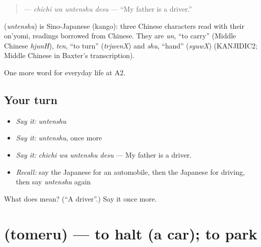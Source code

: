 \begin{quote}
\textbf{ } — \emph{chichi wa untenshu desu} — \textquotedblleft{}My father is a driver.\textquotedblright{}
\end{quote}

\begin{cousinweb}
\textbf{} (\emph{untenshu}) is Sino-Japanese (kango): three Chinese characters read with their on'yomi, readings borrowed from Chinese. They are \emph{un}, \textquotedblleft{}to carry\textquotedblright{} (Middle Chinese \emph{hjunH}), \emph{ten}, \textquotedblleft{}to turn\textquotedblright{} (\emph{trjwenX}) and \emph{shu}, \textquotedblleft{}hand\textquotedblright{} (\emph{syuwX}) (KANJIDIC2; Middle Chinese in Baxter's transcription).
\end{cousinweb}

\begin{grammarlens}[title={What you've built}]
One more word for everyday life at A2.
\end{grammarlens}

\subsection*{Your turn}
\begin{itemize}
\raggedright
  \item \emph{Say it:} \emph{untenshu}
  \item \emph{Say it:} \emph{untenshu}, once more
  \item \emph{Say it:} \emph{chichi wa untenshu desu} — My father is a driver.
  \item \emph{Recall:} say the Japanese for an automobile, then the Japanese for driving, then say \emph{untenshu} again
\end{itemize}

\begin{tcolorbox}[breakable,colback=teal!4,colframe=teal!35!black,title={Before you move on}]
What does  mean? (\textquotedblleft{}A driver\textquotedblright{}.) Say it once more.
\end{tcolorbox}
\section[\texorpdfstring{\ja{とめる} (tomeru)}{とめる (tomeru)}]{ (tomeru) — to halt (a car); to park}

\label{lesson:JA-C202-tomeru}



